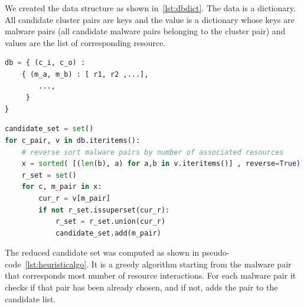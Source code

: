 We created the data structure as shown in~\ref{lst:dbdict}.
The data is a dictionary.
All candidate cluster pairs are keys and the value is a dictionary whose keys are malware pairs (all candidate malware pairs belonging to the cluster pair) and values are the list of corresponding resource.
\begin{lstlisting}[language=python,floatplacement=htpb,caption={Database Structure},label={lst:dbdict}]
db = { (c_i, c_o) :
    { (m_a, m_b) : [ r1, r2 ,...],
        ...,
     }
}
\end{lstlisting}
\begin{lstlisting}[float,floatplacement=htbp,language=python,caption={Pseudo code (Python) to get minimal set of candidates for all resource},label={lst:heuristicalgo}]
candidate_set = set()
for c_pair, v in db.iteritems():
    # reverse sort malware pairs by number of associated resources
    x = sorted( [(len(b), a) for a,b in v.iteritems()] , reverse=True)
    r_set = set()
    for c, m_pair in x:
        cur_r = v[m_pair]
        if not r_set.issuperset(cur_r):
            r_set = r_set.union(cur_r)
            candidate_set.add(m_pair)
\end{lstlisting}

The reduced candidate set was computed as shown in pseudo-code~\ref{lst:heuristicalgo}.
It is a greedy algorithm starting from the malware pair that corresponds most number of resource interactions.
For each malware pair it checks if that pair has been already chosen, and if not, adds the pair to the candidate list.
